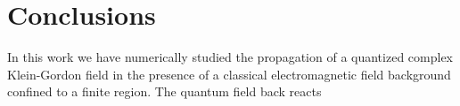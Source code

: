 \chapter{Conclusions}

In this work we have numerically studied the propagation of a quantized complex Klein-Gordon field in the presence of a classical electromagnetic field background confined to a finite region. The quantum field back reacts 